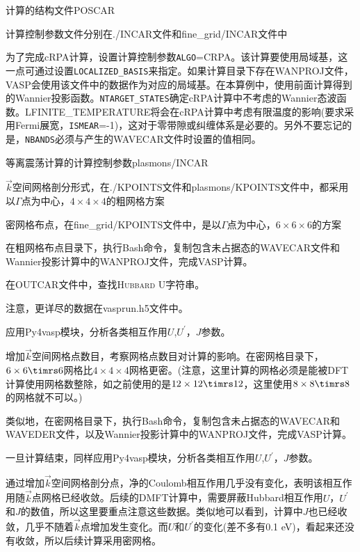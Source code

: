 计算的结构文件\textrm{POSCAR}

计算控制参数文件分别在\textrm{./INCAR}文件和\textrm{fine\_grid/INCAR}文件中

为了完成\textrm{cRPA}计算，设置计算控制参数\texttt{ALGO}=\textrm{CRPA}。该计算要使用局域基，这一点可通过设置\texttt{LOCALIZED\_BASIS}来指定。如果计算目录下存在\textrm{WANPROJ}文件，\textrm{VASP}会使用该文件中的数据作为对应的局域基。在本算例中，使用前面计算得到的\textrm{Wannier}投影函数。\texttt{NTARGET\_STATES}确定\textrm{cRPA}计算中不考虑的\textrm{Wannier}态波函数。\textrm{LFINITE\_TEMPERATURE}将会在\textrm{cRPA}计算中考虑有限温度的影响(要求采用\textrm{Fermi}展宽，\texttt{ISMEAR}=-1)，这对于零带隙或纠缠体系是必要的。另外不要忘记的是，\texttt{NBANDS}必须与产生的\textrm{WAVECAR}文件时设置的值相同。

等离震荡计算的计算控制参数\textrm{plasmons/INCAR}

$\vec k$空间网格剖分形式，在\textrm{./KPOINTS}文件和\textrm{plasmons/KPOINTS}文件中，都采用以$\Gamma$点为中心，$4\times4\times4$的粗网格方案

密网格布点，在\textrm{fine\_grid/KPOINTS}文件中，是以$\Gamma$点为中心，$6\times6\times6$的方案

在粗网格布点目录下，执行\textrm{Bash}命令，复制包含未占据态的\textrm{WAVECAR}文件和\textrm{Wannier}投影计算中的\textrm{WANPROJ}文件，完成\textrm{VASP}计算。

在\textrm{OUTCAR}文件中，查找\textsc{Hubbard U}字符串。

注意，更详尽的数据在\textrm{vasprun.h5}文件中。

应用\textrm{Py4vasp}模块，分析各类相互作用$U$,$U^{\prime}$，$J$参数。

增加$\vec k$空间网格点数目，考察网格点数目对计算的影响。在密网格目录下，$6\times6\timrs6$网格比$4\times4\times4$网格更密。(注意，这里计算的网格必须是能被\textrm{DFT}计算使用网格数整除，如之前使用的是$12\times12\timrs12$，这里使用$8\times8\timrs8$的网格就不可以。)

类似地，在密网格目录下，执行\textrm{Bash}命令，复制包含未占据态的\textrm{WAVECAR}和\textrm{WAVEDER}文件，以及\textrm{Wannier}投影计算中的\textrm{WANPROJ}文件，完成\textrm{VASP}计算。

一旦计算结束，同样应用\textrm{Py4vasp}模块，分析各类相互作用$U$,$U^{\prime}$，$J$参数。

通过增加$\vec k$空间网格剖分点，净的\textrm{Coulomb}相互作用几乎没有变化，表明该相互作用随$\vec k$点网格已经收敛。后续的\textrm{DMFT}计算中，需要屏蔽\textrm{Hubbard}相互作用$U$，$U^{\prime}$和$J$的数值，所以这里要重点注意这些数据。类似地可以看到，计算中$J$也已经收敛，几乎不随着$\vec k$点增加发生变化。而$U$和$U^{\prime}$的变化(差不多有\textrm{0.1 eV})，看起来还没有收敛，所以后续计算采用密网格。

